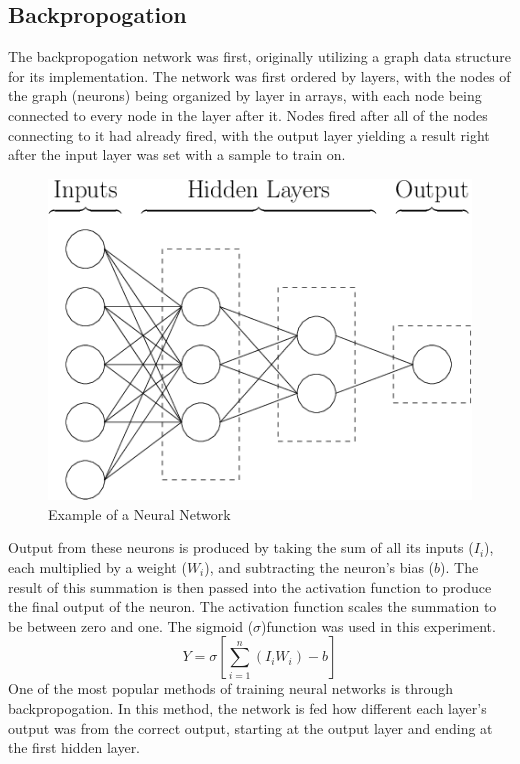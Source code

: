 \documentclass[12pt]{article}
\begin{document}
    \subsection{Backpropogation} 
        The backpropogation network was first, originally utilizing a graph data structure for its 
        implementation.  The network was first ordered by layers, with the nodes of the graph (neurons) 
        being organized by layer in arrays, with each node being connected to every node in the layer after it.  
        Nodes fired after all of the nodes connecting to it had already fired, with the output layer yielding a result right after the 
        input layer was set with a sample to train on.
        \begin{figure}[h]
            \includegraphics[scale=.3]{nnDiagram.png}
            \centering
            \caption{Example of a Neural Network \cite{nnDiagram}}
        \end{figure}

        Output from these neurons is produced by taking the sum of all its inputs (\(I_i\)), each multiplied by a weight (\(W_i\)), 
        and subtracting the neuron's bias (\(b\)).  The result of this summation is then passed into the activation function to produce 
        the final output of the neuron. The activation function scales the summation to be between zero and one.  The sigmoid (\(\sigma\))function
        was used in this experiment.
        \begin{equation}\label{inputSum}
            Y = \sigma[\sum_{i=1}^{n} (I_i W_i) - b] 
        \end{equation}
        One of the most popular methods of training neural networks is through backpropogation.  
        In this method, the network is fed how different each layer's output was from the correct output, 
        starting at the output layer and ending at the first hidden layer.
\end{document}
